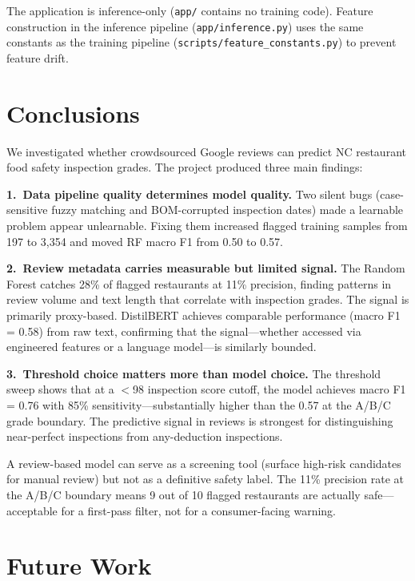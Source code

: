 \documentclass{article}
\begin{document}
The application is inference-only (\texttt{app/} contains no training code). Feature construction in the inference pipeline (\texttt{app/inference.py}) uses the same constants as the training pipeline (\texttt{scripts/feature\_constants.py}) to prevent feature drift.

\section{Conclusions}

We investigated whether crowdsourced Google reviews can predict NC restaurant food safety inspection grades. The project produced three main findings:

\textbf{1.\ Data pipeline quality determines model quality.} Two silent bugs (case-sensitive fuzzy matching and BOM-corrupted inspection dates) made a learnable problem appear unlearnable. Fixing them increased flagged training samples from 197 to 3,354 and moved RF macro F1 from 0.50 to 0.57.

\textbf{2.\ Review metadata carries measurable but limited signal.} The Random Forest catches 28\% of flagged restaurants at 11\% precision, finding patterns in review volume and text length that correlate with inspection grades. The signal is primarily proxy-based. DistilBERT achieves comparable performance (macro F1 = 0.58) from raw text, confirming that the signal---whether accessed via engineered features or a language model---is similarly bounded.

\textbf{3.\ Threshold choice matters more than model choice.} The threshold sweep shows that at a $<$98 inspection score cutoff, the model achieves macro F1 = 0.76 with 85\% sensitivity---substantially higher than the 0.57 at the A/B/C grade boundary. The predictive signal in reviews is strongest for distinguishing near-perfect inspections from any-deduction inspections.

A review-based model can serve as a screening tool (surface high-risk candidates for manual review) but not as a definitive safety label. The 11\% precision rate at the A/B/C boundary means 9 out of 10 flagged restaurants are actually safe---acceptable for a first-pass filter, not for a consumer-facing warning.

\section{Future Work}
\end{document}
